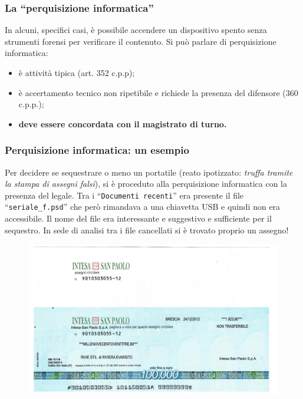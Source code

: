 \documentclass[11pt]{beamer}
\begin{document}
	\begin{frame} %
		\frametitle{La ``perquisizione informatica''}
		In alcuni, specifici casi, è possibile accendere un dispositivo spento senza strumenti forensi per verificare il contenuto. 
		\vfill
		Si può parlare di perquisizione informatica:
		\begin{itemize}
			\item è attività tipica (art. 352 c.p.p);
			\item è accertamento tecnico non ripetibile e richiede la presenza del difensore (360 c.p.p.);
			\item \textbf{deve essere concordata con il magistrato di turno.}
		\end{itemize}
	\end{frame}
	
	\begin{frame}[shrink]
		\frametitle{Perquisizione informatica: un esempio}
		Per decidere se sequestrare o meno un portatile (reato ipotizzato: \textit{truffa tramite la stampa di assegni falsi}), si è proceduto alla perquisizione informatica con la presenza del legale.
		\vfill
		Tra i ``\texttt{Documenti recenti}'' era presente il file ``\texttt{seriale\_f.psd}'' che però rimandava a una chiavetta USB e quindi non era accessibile.
		\vfill
		Il nome del file era interessante e suggestivo e sufficiente per il sequestro. In sede di analisi tra i file cancellati si è trovato proprio un assegno!
		\begin{figure}
			\centering
			\includegraphics[width=0.6\textheight]{pics/assegno_psd}
			\label{fig:assegno_psd}
		\end{figure}
	\end{frame}
		
	
	
\end{document}

